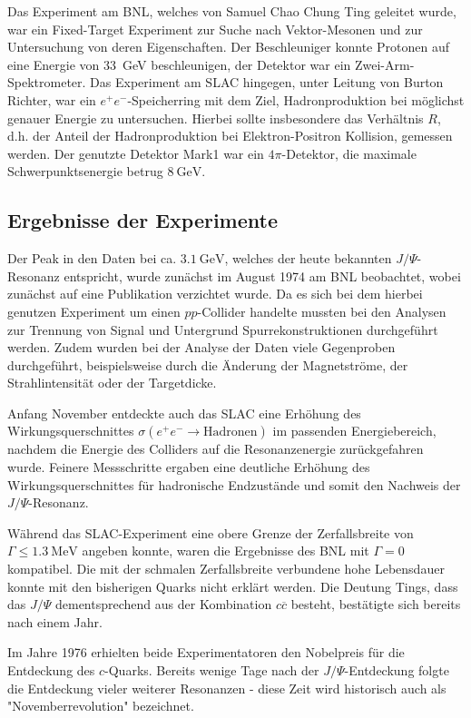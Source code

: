 Das Experiment am BNL, welches von Samuel Chao Chung Ting geleitet wurde, war ein Fixed-Target Experiment zur Suche nach Vektor-Mesonen und zur Untersuchung von deren Eigenschaften.
Der Beschleuniger konnte Protonen auf eine Energie von \SI{33}{\giga\electronvolt} beschleunigen, der Detektor war ein Zwei-Arm-Spektrometer.
Das Experiment am SLAC hingegen, unter Leitung von Burton Richter, war ein $e^+ e^-$-Speicherring mit dem Ziel, Hadronproduktion bei möglichst genauer Energie zu untersuchen.
Hierbei sollte insbesondere das Verhältnis $R$, d.h. der Anteil der Hadronproduktion bei Elektron-Positron Kollision, gemessen werden.
Der genutzte Detektor Mark1 war ein $4\pi$-Detektor, die maximale Schwerpunktsenergie betrug $\SI{8}{\giga\electronvolt}$. 

\subsection{Ergebnisse der Experimente}

Der Peak in den Daten bei ca. $\SI{3.1}{\giga\electronvolt}$, welches der heute bekannten $J/\Psi$-Resonanz entspricht, wurde zunächst im August 1974 am BNL beobachtet, wobei zunächst auf eine Publikation verzichtet wurde.
Da es sich bei dem hierbei genutzen Experiment um einen $pp$-Collider handelte mussten bei den Analysen zur Trennung von Signal und Untergrund Spurrekonstruktionen durchgeführt werden.
Zudem wurden bei der Analyse der Daten viele Gegenproben durchgeführt, beispielsweise durch die Änderung der Magnetströme, der Strahlintensität oder der Targetdicke.

Anfang November entdeckte auch das SLAC eine Erhöhung des Wirkungsquerschnittes $\sigma\left(e^+ e^- \to \text{Hadronen}\right)$ im passenden Energiebereich, nachdem die Energie des Colliders auf die Resonanzenergie zurückgefahren wurde.
Feinere Messschritte ergaben eine deutliche Erhöhung des Wirkungsquerschnittes für hadronische Endzustände und somit den Nachweis der $J/\Psi$-Resonanz.

Während das SLAC-Experiment eine obere Grenze der Zerfallsbreite von $\Gamma \leq \SI{1.3}{\mega\electronvolt}$ angeben konnte, waren die Ergebnisse des BNL mit $\Gamma = 0$ kompatibel.
Die mit der schmalen Zerfallsbreite verbundene hohe Lebensdauer konnte mit den bisherigen Quarks nicht erklärt werden.
Die Deutung Tings, dass das $J/\Psi$ dementsprechend aus der Kombination $c\overline{c}$ besteht, bestätigte sich bereits nach einem Jahr.

Im Jahre 1976 erhielten beide Experimentatoren den Nobelpreis für die Entdeckung des $c$-Quarks.
Bereits wenige Tage nach der $J/\Psi$-Entdeckung folgte die Entdeckung vieler weiterer Resonanzen - diese Zeit wird historisch auch als "Novemberrevolution" bezeichnet.

